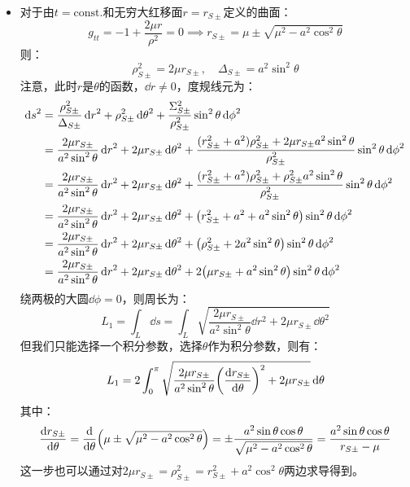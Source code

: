 \documentclass[a4paper]{article}
\begin{document}
\begin{enumerate}
\begin{itemize}
        \item 对于由$t = \mathrm{const.}$和无穷大红移面$r = r_{S\pm}$定义的曲面：
        \[
            g_{tt} = -1 + \frac{2\mu r}{\rho^2} = 0 \implies r_{S\pm} = \mu \pm \sqrt{\mu^2 - a^2\cos^2\theta}
        \]
        则：
        \[
            \rho_{S\pm}^2 = 2\mu r_{S\pm},\quad \Delta_{S\pm} = a^2 \sin^2{\theta}
        \]
        注意，此时$r$是$\theta$的函数，$\dd{r} \neq 0$，度规线元为：
        \begin{align*}
            \dd{s}^2
            &= \frac{\rho_{S\pm}^2}{\Delta_{S\pm}} \dd{r}^2 + \rho_{S\pm}^2 \dd{\theta}^2 + \frac{\Sigma_{S\pm}^2}{\rho_{S\pm}^2} \sin^2{\theta} \dd{\phi}^2 \\
            &= \frac{2\mu r_{S\pm}}{a^2 \sin^2{\theta}} \dd{r}^2 + 2\mu r_{S\pm} \dd{\theta}^2 + \frac{(r_{S\pm}^2 + a^2) \rho_{S\pm}^2 + 2\mu r_{S\pm} a^2 \sin^2{\theta}}{\rho_{S\pm}^2} \sin^2{\theta} \dd{\phi}^2 \\
            &= \frac{2\mu r_{S\pm}}{a^2 \sin^2{\theta}} \dd{r}^2 + 2\mu r_{S\pm} \dd{\theta}^2 + \frac{(r_{S\pm}^2 + a^2) \rho_{S\pm}^2 + \rho_{S\pm}^2 a^2 \sin^2{\theta}}{\rho_{S\pm}^2} \sin^2{\theta} \dd{\phi}^2 \\
            &= \frac{2\mu r_{S\pm}}{a^2 \sin^2{\theta}} \dd{r}^2 + 2\mu r_{S\pm} \dd{\theta}^2 + \qty(r_{S\pm}^2 + a^2 + a^2 \sin^2{\theta}) \sin^2{\theta} \dd{\phi}^2 \\
            &= \frac{2\mu r_{S\pm}}{a^2 \sin^2{\theta}} \dd{r}^2 + 2\mu r_{S\pm} \dd{\theta}^2 + \qty(\rho_{S\pm}^2 + 2a^2 \sin^2{\theta}) \sin^2{\theta} \dd{\phi}^2 \\
            &= \frac{2\mu r_{S\pm}}{a^2 \sin^2{\theta}} \dd{r}^2 + 2\mu r_{S\pm} \dd{\theta}^2 + 2\qty(\mu r_{S\pm} + a^2 \sin^2{\theta}) \sin^2{\theta} \dd{\phi}^2
        \end{align*}
        绕两极的大圆$\dd{\phi} = 0$，则周长为：
        \[
            L_1 = \int_L \dd{s} = \int_L \sqrt{\frac{2\mu r_{S\pm}}{a^2 \sin^2{\theta}} \dd{r}^2 + 2\mu r_{S\pm} \dd{\theta}^2}
        \]
        但我们只能选择一个积分参数，选择$\theta$作为积分参数，则有：
        \[
            L_1 = 2\int_0^\pi \sqrt{\frac{2\mu r_{S\pm}}{a^2 \sin^2{\theta}} \qty(\dv{r_{S\pm}}{\theta})^2 + 2\mu r_{S\pm}} \dd{\theta}
        \]
        其中：
        \[
            \dv{r_{S\pm}}{\theta} = \dv{\theta} \qty(\mu \pm \sqrt{\mu^2 - a^2\cos^2\theta}) = \pm \frac{a^2 \sin{\theta} \cos{\theta}}{\sqrt{\mu^2 - a^2 \cos^2{\theta}}} = \frac{a^2 \sin{\theta} \cos{\theta}}{r_{S\pm} - \mu}
        \]
        这一步也可以通过对$2\mu r_{S\pm} = \rho_{S\pm}^2 = r_{S\pm}^2 + a^2\cos^2{\theta}$两边求导得到。


\end{itemize}
\end{enumerate}
\end{document}
